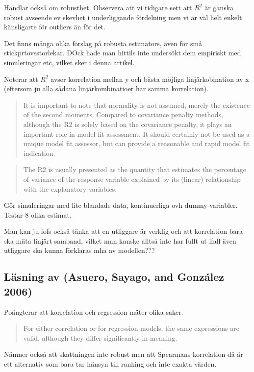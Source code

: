 \documentclass[]{article}
\begin{document}
Handlar också om robusthet. Observera att vi tidigare sett att \(R^2\)
är ganska robust avseende ev skevhet i underliggande fördelning men vi
är väl helt enkelt känsligarte för outliers än för det.

Det finns många olika förslag på robusta estimators, även för små
stickprtovsstorlekar. DOck hade man hittils inte undersökt dem empiriskt
med simuleringar etc, vilket sker i denna artikel.

Noterar att \(R^2\) avser korrelation mellan y och bästa möjliga
linjärkobination av x (eftersom ju alla sådana linjärkombinatioer har
samma korrelation).

\begin{quote}
It is important to note that normality is not assumed, merely the
existence of the second moments. Compared to covariance penalty methods,
although the R2 is solely based on the covariance penalty, it plays an
important role in model fit assessment. It should certainly not be used
as a unique model fit assessor, but can provide a reasonable and rapid
model fit indication.
\end{quote}

\begin{quote}
The R2 is usually presented as the quantity that estimates the
percentage of variance of the response variable explained by its
(linear) relationship with the explanatory variables.
\end{quote}

Gör simuleringar med lite blandade data, kontinuerliga ovh
dummy-variabler. Testar 8 olika estimat.

Man kan ju iofs också tänka att en utliggare är verklig och att
korrelation bara ska mäta linjärt samband, vilket man kanske alltså inte
har fullt ut ifall även utliggare ska kunna förklaras mha av modellen???

\subsection{Läsning av (Asuero, Sayago, and González
2006)}\label{lasning-av-asuero2006}

Poängterar att korrelation och regression mäter olika saker.

\begin{quote}
For either correlation or for regression models, the same expressions
are valid, although they differ significantly in meaning.
\end{quote}

Nämner också att skattningen inte robust men att Spearmans korrelation
då är ett alternativ som bara tar hänsyn till ranking och inte exakta
värden.
\end{document}
